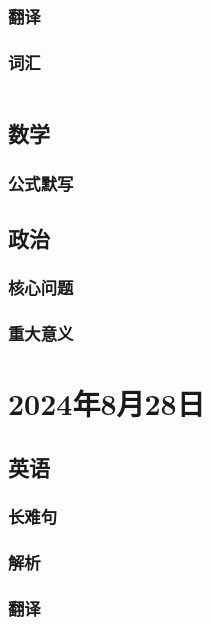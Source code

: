 \documentclass[UTF8]{ctexart}
\begin{document}
\subsubsection{翻译}
\subsubsection{词汇}\begin{table}[h]
      \centering
      \begin{tabular}{p{}p{}}
      \end{tabular}
\end{table}
\subsection{数学}
\subsubsection{公式默写}
\begin{multicols}{2}
\end{multicols}
\subsection{政治}
\subsubsection{}
\subsubsection{核心问题}
\subsubsection{重大意义}
\section{2024年8月28日}
\subsection{英语}
\subsubsection{长难句}
\subsubsection{解析}
\subsubsection{翻译}
\end{document}

